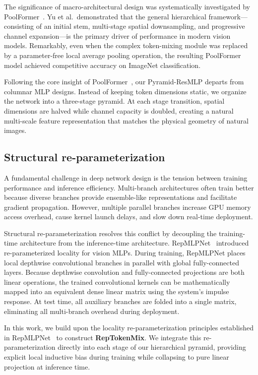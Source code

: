 The significance of macro-architectural design was systematically investigated by PoolFormer~\cite{yu2022metaformer}. Yu et al.\ demonstrated that the general hierarchical framework---consisting of an initial stem, multi-stage spatial downsampling, and progressive channel expansion---is the primary driver of performance in modern vision models. Remarkably, even when the complex token-mixing module was replaced by a parameter-free local average pooling operation, the resulting PoolFormer model achieved competitive accuracy on ImageNet classification.

Following the core insight of PoolFormer~\cite{yu2022metaformer}, our Pyramid-ResMLP departs from columnar MLP designs. Instead of keeping token dimensions static, we organize the network into a three-stage pyramid. At each stage transition, spatial dimensions are halved while channel capacity is doubled, creating a natural multi-scale feature representation that matches the physical geometry of natural images.

\subsection{Structural re-parameterization}
\label{subsection:structural_reparameterization}
A fundamental challenge in deep network design is the tension between training performance and inference efficiency. Multi-branch architectures often train better because diverse branches provide ensemble-like representations and facilitate gradient propagation. However, multiple parallel branches increase GPU memory access overhead, cause kernel launch delays, and slow down real-time deployment.

Structural re-parameterization resolves this conflict by decoupling the training-time architecture from the inference-time architecture. RepMLPNet~\cite{ding2022repmlp} introduced re-parameterized locality for vision MLPs. During training, RepMLPNet places local depthwise convolutional branches in parallel with global fully-connected layers. Because depthwise convolution and fully-connected projections are both linear operations, the trained convolutional kernels can be mathematically mapped into an equivalent dense linear matrix using the system's impulse response. At test time, all auxiliary branches are folded into a single matrix, eliminating all multi-branch overhead during deployment.

In this work, we build upon the locality re-parameterization principles established in RepMLPNet~\cite{ding2022repmlp} to construct \textbf{RepTokenMix}. We integrate this re-parameterization directly into each stage of our hierarchical pyramid, providing explicit local inductive bias during training while collapsing to pure linear projection at inference time.
